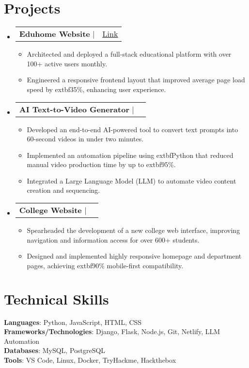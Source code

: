 \documentclass[letterpaper,11pt]{article}
\makeatletter
\newcommand{\resumeItem}[1]{
  \item\small{
    {#1 \vspace{-2pt}}
  }
}
\newcommand{\resumeProjectHeading}[2]{
    \item
    \begin{tabular*}{0.97\textwidth}{l@{\extracolsep{\fill}}r}
      \small#1 & #2 \\
    \end{tabular*}\vspace{-7pt}
}
\newcommand{\resumeSubHeadingListStart}{\begin{itemize}[leftmargin=0.15in, label={}]}
\newcommand{\resumeSubHeadingListEnd}{\end{itemize}}
\newcommand{\resumeItemListStart}{\begin{itemize}}
\newcommand{\resumeItemListEnd}{\end{itemize}\vspace{-5pt}}
\makeatother
\begin{document}
\section{Projects}
    \resumeSubHeadingListStart
        \resumeProjectHeading
        {\textbf{Eduhome Website} $|$ \emph{}}
        {\href{https://myeduhome.netlify.app}{\underline{Link}}}
        \resumeItemListStart
                        \resumeItem{Architected and deployed a full-stack educational platform with over 100+ active users monthly.}
                        \resumeItem{Engineered a responsive frontend layout that improved average page load speed by 	extbf{35\%}, enhancing user experience.}
                    \resumeItemListEnd
        \resumeProjectHeading
        {\textbf{AI Text-to-Video Generator} $|$ \emph{}}
        {}
        \resumeItemListStart
                        \resumeItem{Developed an end-to-end AI-powered tool to convert text prompts into 60-second videos in under two minutes.}
                        \resumeItem{Implemented an automation pipeline using 	extbf{Python} that reduced manual video production time by up to 	extbf{95\%}.}
                        \resumeItem{Integrated a Large Language Model (LLM) to automate video content creation and sequencing.}
                    \resumeItemListEnd
        \resumeProjectHeading
        {\textbf{College Website} $|$ \emph{}}
        {}
        \resumeItemListStart
                        \resumeItem{Spearheaded the development of a new college web interface, improving navigation and information access for over 600+ students.}
                        \resumeItem{Designed and implemented highly responsive homepage and department pages, achieving 	extbf{90\%} mobile-first compatibility.}
                    \resumeItemListEnd
    \resumeSubHeadingListEnd


\section{Technical Skills}
 \begin{itemize}[leftmargin=0.15in, label={}]
    \small{\item{
         \textbf{Languages}{: Python, JavaScript, HTML, CSS} \\
         \textbf{Frameworks/Technologies}{: Django, Flask, Node.js, Git, Netlify, LLM Automation} \\
         \textbf{Databases}{: MySQL, PostgreSQL} \\
         \textbf{Tools}{: VS Code, Linux, Docker, TryHackme, Hackthebox} \\
        }}
 \end{itemize}

\end{document}
